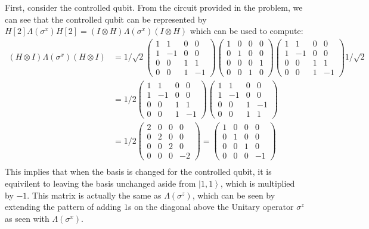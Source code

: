 \documentclass{exam} %
\theoremstyle{plain}
\theoremstyle{definition}
\theoremstyle{remark}
\newcommand{\pmat}[1]{ \begin{pmatrix} #1 \end{pmatrix} }
\numberwithin{equation}{section}  %
\renewcommand{\ket}[1]{ \left| #1 \right> }
\newcommand{\LambdaMat}{
  \pmat{
    1&0&0&0\\
    0&1&0&0\\
    0&0&0&1\\
    0&0&1&0
  }
}
\begin{document}
\begin{questions}
\begin{solution}
    First, consider the controlled qubit. From the circuit provided in the
    problem, we can see that the controlled qubit can be represented by
    $H[2]\Lambda(\sigma^x)H[2] = (I\otimes H)\Lambda(\sigma^x)(I\otimes H)$
    which can be used to compute:
    \begin{align*}
      (H\otimes I)\Lambda(\sigma^x)(H\otimes I)
      &=
      1/\sqrt{2}
      \pmat{ 
      1&1&0&0\\
      1&-1&0&0\\
      0&0&1&1\\
      0&0&1&-1
      }
      \LambdaMat
      \pmat{ 
      1&1&0&0\\
      1&-1&0&0\\
      0&0&1&1\\
      0&0&1&-1
      }
      1/\sqrt{2}\\
      &=
      1/2
      \pmat{ 
      1&1&0&0\\
      1&-1&0&0\\
      0&0&1&1\\
      0&0&1&-1
      }
      \pmat{ 
      1&1&0&0\\
      1&-1&0&0\\
      0&0&1&-1\\
      0&0&1&1
      }\\
      &=
      1/2
      \pmat{ 
      2&0&0&0\\
      0&2&0&0\\
      0&0&2&0\\
      0&0&0&-2
      } 
      =
      \pmat{ 
      1&0&0&0\\
      0&1&0&0\\
      0&0&1&0\\
      0&0&0&-1
      } \\
    \end{align*}
    This implies that when the basis is changed for the controlled qubit, it
    is equivilent to leaving the basis unchanged aside from $\ket{1,1}$,
    which is multiplied by $-1$. This matrix is actually the same as $\Lambda
    (\sigma^z)$, which can be seen by extending the pattern of adding $1$s on 
    the diagonal above the Unitary operator $\sigma^z$ as seen with $\Lambda
    (\sigma^x)$.\\


\end{solution}
\end{questions}
\end{document}
